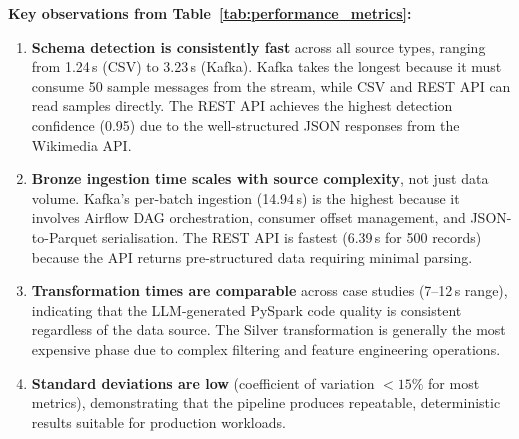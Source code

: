 \begin{table}[ht]
\centering
\caption{Performance metrics across all three case studies (mean $\pm$ std, N=10)}
\label{tab:performance_metrics}
\end{table}

\textbf{Key observations from Table~\ref{tab:performance_metrics}:}

\begin{enumerate}
\item \textbf{Schema detection is consistently fast} across all source types, ranging from 1.24\,s (CSV) to 3.23\,s (Kafka). Kafka takes the longest because it must consume 50 sample messages from the stream, while CSV and REST API can read samples directly. The REST API achieves the highest detection confidence (0.95) due to the well-structured JSON responses from the Wikimedia API.

\item \textbf{Bronze ingestion time scales with source complexity}, not just data volume. Kafka's per-batch ingestion (14.94\,s) is the highest because it involves Airflow DAG orchestration, consumer offset management, and JSON-to-Parquet serialisation. The REST API is fastest (6.39\,s for 500 records) because the API returns pre-structured data requiring minimal parsing.

\item \textbf{Transformation times are comparable} across case studies (7--12\,s range), indicating that the LLM-generated PySpark code quality is consistent regardless of the data source. The Silver transformation is generally the most expensive phase due to complex filtering and feature engineering operations.

\item \textbf{Standard deviations are low} (coefficient of variation $< 15\%$ for most metrics), demonstrating that the pipeline produces repeatable, deterministic results suitable for production workloads.
\end{enumerate}

